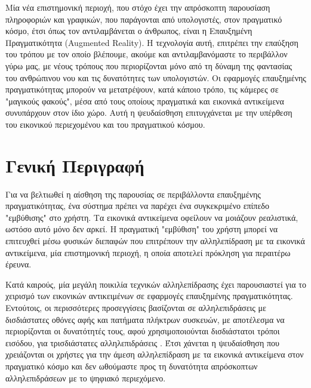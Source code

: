 

 \label{c:intro}

Μία νέα επιστημονική περιοχή, που στόχο έχει την απρόσκοπτη παρουσίαση πληροφοριών και γραφικών, που παράγονται από υπολογιστές, στον πραγματικό κόσμο, έτσι όπως τον αντιλαμβάνεται ο άνθρωπος, είναι η Επαυξημένη Πραγματικότητα (Augmented Reality). 
Η τεχνολογία αυτή, επιτρέπει την επαύξηση του τρόπου με τον οποίο βλέπουμε, ακούμε και αντιλαμβανόμαστε το περιβάλλον γύρω μας, με νέους τρόπους που περιορίζονται μόνο από τη δύναμη της φαντασίας του ανθρώπινου νου και τις δυνατότητες των υπολογιστών. Οι εφαρμογές επαυξημένης πραγματικότητας μπορούν να μετατρέψουν, κατά κάποιο τρόπο, τις κάμερες σε "μαγικούς φακούς", μέσα από τους οποίους πραγματικά και εικονικά αντικείμενα συνυπάρχουν στον ίδιο χώρο. Αυτή η ψευδαίσθηση επιτυγχάνεται με την υπέρθεση του εικονικού περιεχομένου και του πραγματικού κόσμου. 


\section{Γενική Περιγραφή}



Για να βελτιωθεί η αίσθηση της παρουσίας σε περιβάλλοντα επαυξημένης πραγματικότητας, ένα σύστημα πρέπει να παρέχει ένα συγκεκριμένο επίπεδο "εμβύθισης" στο χρήστη. Τα εικονικά αντικείμενα οφείλουν να μοιάζουν ρεαλιστικά, ωστόσο αυτό μόνο δεν αρκεί. Η πραγματική "εμβύθιση" του χρήστη μπορεί να επιτευχθεί μέσω φυσικών διεπαφών που επιτρέπουν την αλληλεπίδραση με τα εικονικά αντικείμενα, μία επιστημονική περιοχή, η οποία αποτελεί πρόκληση για περαιτέρω έρευνα.


Κατά καιρούς, μία μεγάλη ποικιλία τεχνικών αλληλεπίδρασης έχει παρουσιαστεί για το χειρισμό των εικονικών αντικειμένων σε εφαρμογές επαυξημένης πραγματικότητας. Εντούτοις, οι περισσότερες προσεγγίσεις βασίζονται σε αλληλεπιδράσεις με δισδιάστατες οθόνες αφής και πατήματα πλήκτρων συσκευών, με αποτέλεσμα να περιορίζονται οι δυνατότητές τους, αφού χρησιμοποιούνται δισδιάστατοι τρόποι εισόδου, για τρισδιάστατες αλληλεπιδράσεις \cite{zhou2008trends} . Έτσι χάνεται η ψευδαίσθηση που χρειάζονται οι χρήστες για την άμεση αλληλεπίδραση με τα εικονικά αντικείμενα στον πραγματικό κόσμο και δεν ωθούμαστε προς τη δυνατότητα απρόσκοπτων αλληλεπιδράσεων με το ψηφιακό περιεχόμενο.


